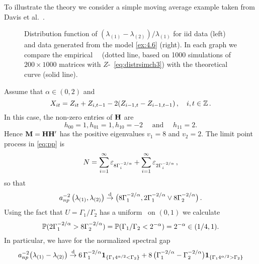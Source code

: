 To illustrate the theory we consider a simple moving average example
taken from Davis et al.~\cite{davis:mikosch:pfaffel:2015}.
\begin{example} \rm
\begin{figure}[htb!]
  \centering
  \caption{Distribution function of $(\lambda_{(1)} - \lambda_{(2)})/\lambda_{(1)}$ for iid data (left) and
    data generated from the model \eqref{ex:4.6} (right). In each graph we compare the empirical \ds\ \fct\
(dotted line, based on
1000 simulations of $200 \times 1000$ matrices with $Z$-\ds\ \eqref{eq:distrsimch3}) with the theoretical curve (solid line).}
  \label{fig:ProbMass}
\end{figure}
Assume that $\alpha\in (0,2)$ and
\begin{equation}\label{ex:4.6}
X_{it}= Z_{it}+ Z_{i,t-1}-2 (Z_{i-1,t}- Z_{i-1,t-1})\,,\quad i,t\in\Z\,.
\end{equation}
In this case, the non-zero entries of $\H$ are
\begin{equation*}
h_{00}=1, h_{01}=1,h_{10}=-2 \quad \mbox{ and }\quad h_{11}=2.
\end{equation*}
Hence $\M=\H\H'$ has the positive eigenvalues
$v_1=8$ and $v_2=2$. The limit point process in \eqref{eq:pp} is
\begin{equation*}
N=\sum_{i=1}^\infty \vep_{8\Gamma_i^{-2/\alpha}}+ \sum_{i=1}^\infty \vep_{2\Gamma_i^{-2/\alpha}}\,,
\end{equation*}
so that
\begin{equation*}
a_{np}^{-2}\,\big(\la_{(1)},\la_{(2)}\big) \cid
\big(8\Gamma_{1}^{-2/\alpha}, 2\Gamma_1^{-2/\alpha}\vee 8
\Gamma_2^{-2/\alpha}\big)\,.
\end{equation*}
Using the fact that $U=\Gamma_1/\Gamma_2$ has a uniform \ds\ on $(0,1)$ we calculate
\begin{equation*}
\P(2\Gamma_1^{-2/\alpha}>8\Gamma_2^{-2/\alpha})= \P(\Gamma_1/\Gamma_2<2^{-\alpha})= 2^{-\alpha} \in (1/4,1).
\end{equation*}
In particular, we have for the normalized spectral gap
\begin{equation*}
a_{np}^{-2} \big(\la_{(1)}-\la_{(2)}\big)\cid
6 \,\Gamma_1^{-2/\alpha} \1_{\{\Gamma_1 4^{\alpha/2 }<\Gamma_2\}}+
8\,
\big(\Gamma_1^{-2/\alpha}-\Gamma_2^{-2/\alpha}\big)\1_{\{\Gamma_14^{\alpha/2
  }> \Gamma_2\}}
\end{equation*}

\end{example}
